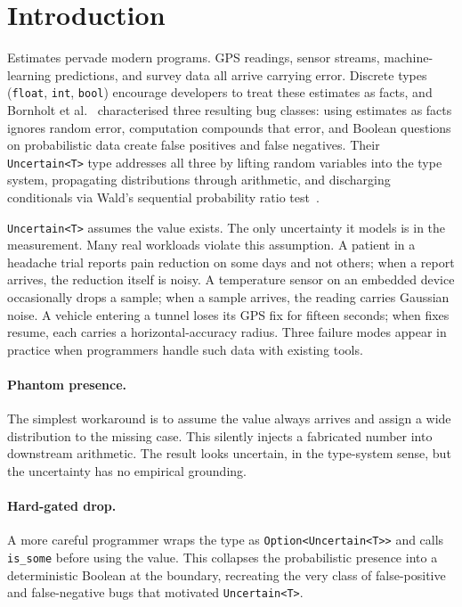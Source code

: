 \section{Introduction}
\label{sec:intro}

Estimates pervade modern programs. GPS readings, sensor streams, machine-learning
predictions, and survey data all arrive carrying error. Discrete types
(\texttt{float}, \texttt{int}, \texttt{bool}) encourage developers to treat
these estimates as facts, and Bornholt et al.~\cite{bornholt2014uncertain}
characterised three resulting bug classes: using estimates as facts ignores
random error, computation compounds that error, and Boolean questions on
probabilistic data create false positives and false negatives. Their
\texttt{Uncertain<T>} type addresses all three by lifting random variables into
the type system, propagating distributions through arithmetic, and discharging
conditionals via Wald's sequential probability ratio test~\cite{wald1945sprt}.

\texttt{Uncertain<T>} assumes the value exists. The only uncertainty it models
is in the measurement. Many real workloads violate this assumption. A patient
in a headache trial reports pain reduction on some days and not others;
when a report arrives, the reduction itself is noisy. A temperature sensor on
an embedded device occasionally drops a sample;
when a sample arrives, the reading carries Gaussian noise. A vehicle entering
a tunnel loses its GPS fix for fifteen seconds;
when fixes resume, each carries a horizontal-accuracy radius.
Three failure modes appear in practice when programmers handle such data with
existing tools.

\paragraph{Phantom presence.} The simplest workaround is to assume the value
always arrives and assign a wide distribution to the missing case. This
silently injects a fabricated number into downstream arithmetic. The result
looks uncertain, in the type-system sense, but the uncertainty has no
empirical grounding.

\paragraph{Hard-gated drop.} A more careful programmer wraps the type as
\texttt{Option<Uncertain<T>>} and calls \texttt{is\_some} before using the
value. This collapses the probabilistic presence into a deterministic Boolean
at the boundary, recreating the very class of false-positive and false-negative
bugs that motivated \texttt{Uncertain<T>}.

